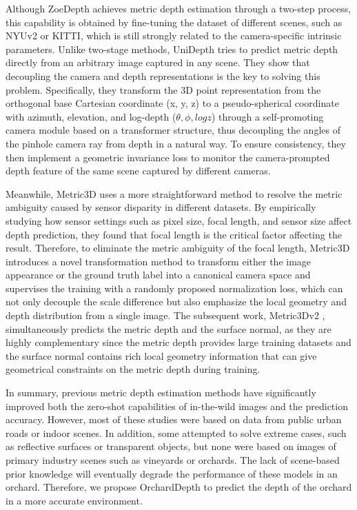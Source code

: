 \documentclass{article}
\begin{document}
Although ZoeDepth achieves metric depth estimation through a two-step process, this capability is obtained by fine-tuning the dataset of different scenes, such as NYUv2 or KITTI, which is still strongly related to the camera-specific intrinsic parameters. Unlike two-stage methods, UniDepth\cite{piccinelli2024unidepth} tries to predict metric depth directly from an arbitrary image captured in any scene. They show that decoupling the camera and depth representations is the key to solving this problem. Specifically, they transform the 3D point representation from the orthogonal base Cartesian coordinate (x, y, z) to a pseudo-spherical coordinate with azimuth, elevation, and log-depth ($\theta, \phi, logz$) through a self-promoting camera module based on a transformer structure, thus decoupling the angles of the pinhole camera ray from depth in a natural way. To ensure consistency, they then implement a geometric invariance loss to monitor the camera-prompted depth feature of the same scene captured by different cameras.

Meanwhile, Metric3D\cite{yin2023metric} uses a more straightforward method to resolve the metric ambiguity caused by sensor disparity in different datasets. By empirically studying how sensor settings such as pixel size, focal length, and sensor size affect depth prediction, they found that focal length is the critical factor affecting the result. Therefore, to eliminate the metric ambiguity of the focal length, Metric3D introduces a novel transformation method to transform either the image appearance or the ground truth label into a canonical camera space and supervises the training with a randomly proposed normalization loss, which can not only decouple the scale difference but also emphasize the local geometry and depth distribution from a single image. The subsequent work, Metric3Dv2 \cite{hu2024metric3dv2}, simultaneously predicts the metric depth and the surface normal, as they are highly complementary since the metric depth provides large training datasets and the surface normal contains rich local geometry information that can give geometrical constraints on the metric depth during training.

In summary, previous metric depth estimation methods have significantly improved both the zero-shot capabilities of in-the-wild images and the prediction accuracy. However, most of these studies were based on data from public urban roads or indoor scenes. In addition, some attempted to solve extreme cases, such as reflective surfaces or transparent objects, but none were based on images of primary industry scenes such as vineyards or orchards. The lack of scene-based prior knowledge will eventually degrade the performance of these models in an orchard. Therefore, we propose OrchardDepth to predict the depth of the orchard in a more accurate environment.
\end{document}
